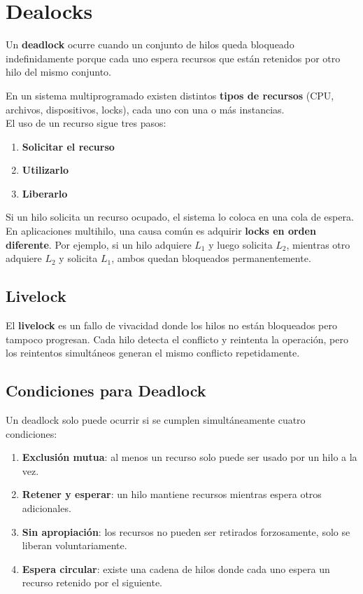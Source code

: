 \documentclass[12pt,letterpaper]{article}
\begin{document}


\newpage

\section*{Dealocks}

Un \textbf{deadlock} ocurre cuando un conjunto de hilos queda bloqueado indefinidamente porque cada uno
espera recursos que están retenidos por otro hilo del mismo conjunto.

En un sistema multiprogramado existen distintos \textbf{tipos de recursos} (CPU, archivos, dispositivos, locks),
cada uno con una o más instancias.\\

\noindent
El uso de un recurso sigue tres pasos:

\begin{enumerate}
\item \textbf{Solicitar el recurso}
\item \textbf{Utilizarlo}
\item \textbf{Liberarlo}
\end{enumerate}

\noindent
Si un hilo solicita un recurso ocupado, el sistema lo coloca en una cola de espera.\\

En aplicaciones multihilo, una causa común es adquirir \textbf{locks en orden diferente}.
Por ejemplo, si un hilo adquiere $L_1$ y luego solicita $L_2$, mientras otro adquiere $L_2$ y
solicita $L_1$, ambos quedan bloqueados permanentemente.

\subsection*{Livelock}

El \textbf{livelock} es un fallo de vivacidad donde los hilos no están bloqueados pero tampoco progresan.
Cada hilo detecta el conflicto y reintenta la operación, pero los reintentos simultáneos generan el mismo
conflicto repetidamente.

\subsection*{Condiciones para Deadlock}
Un deadlock solo puede ocurrir si se cumplen simultáneamente cuatro condiciones:

\begin{enumerate}
\item \textbf{Exclusión mutua}: al menos un recurso solo puede ser usado por un hilo a la vez.
\item \textbf{Retener y esperar}: un hilo mantiene recursos mientras espera otros adicionales.
\item \textbf{Sin apropiación}: los recursos no pueden ser retirados forzosamente, solo se liberan voluntariamente.
\item \textbf{Espera circular}: existe una cadena de hilos donde cada uno espera un recurso retenido por el siguiente.
\end{enumerate}
\end{document}
